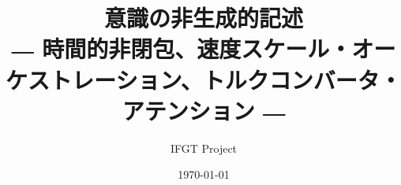 \documentclass[11pt,a4paper]{ltjsarticle}
\title{意識の非生成的記述\\{\large ― 時間的非閉包、速度スケール・オーケストレーション、トルクコンバータ・アテンション ―}}
\author{IFGT Project}
\date{\today}
\begin{document}
\maketitle

\begin{abstract}

\end{abstract}

\setcounter{tocdepth}{1}
\tableofcontents
\clearpage











































\end{document}
